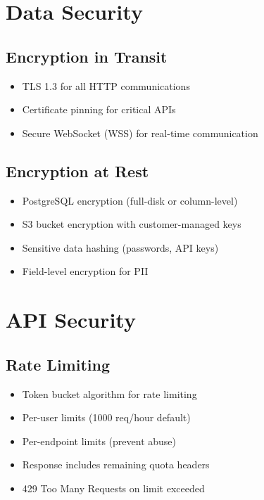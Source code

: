 \documentclass[12pt,a4paper]{report}
\begin{document}
\section{Data Security}

\subsection{Encryption in Transit}

\begin{itemize}[label=\textbullet]
    \item TLS 1.3 for all HTTP communications
    \item Certificate pinning for critical APIs
    \item Secure WebSocket (WSS) for real-time communication
\end{itemize}

\subsection{Encryption at Rest}

\begin{itemize}[label=\textbullet]
    \item PostgreSQL encryption (full-disk or column-level)
    \item S3 bucket encryption with customer-managed keys
    \item Sensitive data hashing (passwords, API keys)
    \item Field-level encryption for PII
\end{itemize}

\section{API Security}

\subsection{Rate Limiting}

\begin{itemize}[label=\textbullet]
    \item Token bucket algorithm for rate limiting
    \item Per-user limits (1000 req/hour default)
    \item Per-endpoint limits (prevent abuse)
    \item Response includes remaining quota headers
    \item 429 Too Many Requests on limit exceeded
\end{itemize}
\end{document}

